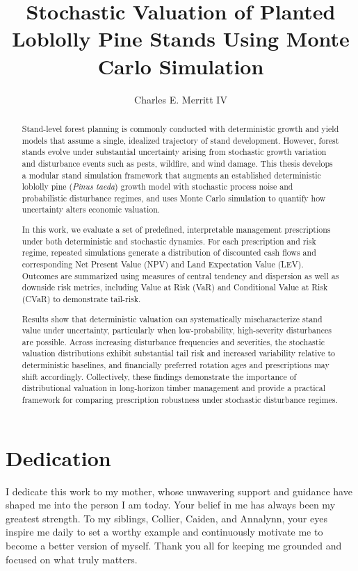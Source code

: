 \documentclass[12pt]{report}
\title{Stochastic Valuation of Planted Loblolly Pine Stands Using Monte Carlo Simulation}
\author{Charles E. Merritt IV}
\begin{document}
\pagestyle{plain}

\begin{abstract}
Stand-level forest planning is commonly conducted with deterministic growth and yield models that assume a single, idealized trajectory of stand development. However, forest stands evolve under substantial uncertainty arising from stochastic growth variation and disturbance events such as pests, wildfire, and wind damage. This thesis develops a modular stand simulation framework that augments an established deterministic loblolly pine (\textit{Pinus taeda}) growth model with stochastic process noise and probabilistic disturbance regimes, and uses Monte Carlo simulation to quantify how uncertainty alters economic valuation.

In this work, we evaluate a set of predefined, interpretable management prescriptions under both deterministic and stochastic dynamics. For each prescription and risk regime, repeated simulations generate a distribution of discounted cash flows and corresponding Net Present Value (NPV) and Land Expectation Value (LEV). Outcomes are summarized using measures of central tendency and dispersion as well as downside risk metrics, including Value at Risk (VaR) and Conditional Value at Risk (CVaR) to demonstrate tail-risk.

Results show that deterministic valuation can systematically mischaracterize stand value under uncertainty, particularly when low-probability, high-severity disturbances are possible. Across increasing disturbance frequencies and severities, the stochastic valuation distributions exhibit substantial tail risk and increased variability relative to deterministic baselines, and financially preferred rotation ages and prescriptions may shift accordingly. Collectively, these findings demonstrate the importance of distributional valuation in long-horizon timber management and provide a practical framework for comparing prescription robustness under stochastic disturbance regimes.
\end{abstract}


\maketitle    %


\chapter*{Dedication}
I dedicate this work to my mother, whose unwavering support and guidance have shaped me into the person I am today. Your belief in me has always been my greatest strength. To my siblings, Collier, Caiden, and Annalynn, your eyes inspire me daily to set a worthy example and continuously motivate me to become a better version of myself. Thank you all for keeping me grounded and focused on what truly matters.
\end{document}

